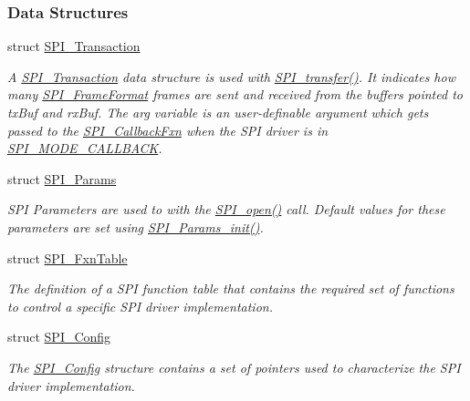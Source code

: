 \subsubsection*{Data Structures}
\begin{DoxyCompactItemize}
\item 
struct \hyperlink{struct_s_p_i___transaction}{S\-P\-I\-\_\-\-Transaction}
\begin{DoxyCompactList}\small\item\em A \hyperlink{struct_s_p_i___transaction}{S\-P\-I\-\_\-\-Transaction} data structure is used with \hyperlink{_s_p_i_8h_a989e17f96b54fcc3dc2cac5f8ac6bdb2}{S\-P\-I\-\_\-transfer()}. It indicates how many \hyperlink{_s_p_i_8h_a53949638d43ae7bf71b74c2b136ad206}{S\-P\-I\-\_\-\-Frame\-Format} frames are sent and received from the buffers pointed to tx\-Buf and rx\-Buf. The arg variable is an user-\/definable argument which gets passed to the \hyperlink{_s_p_i_8h_aeb03e7608a14021c3b0acf92c90e2168}{S\-P\-I\-\_\-\-Callback\-Fxn} when the S\-P\-I driver is in \hyperlink{_s_p_i_8h_ab9ea76c6529d6076eee5e1c4a5a92c6fa5631e69925c47a62a261c78ebbda39fb}{S\-P\-I\-\_\-\-M\-O\-D\-E\-\_\-\-C\-A\-L\-L\-B\-A\-C\-K}. \end{DoxyCompactList}\item 
struct \hyperlink{struct_s_p_i___params}{S\-P\-I\-\_\-\-Params}
\begin{DoxyCompactList}\small\item\em S\-P\-I Parameters are used to with the \hyperlink{_s_p_i_8h_a62cfe494cb1df47cd602e8747e894fd1}{S\-P\-I\-\_\-open()} call. Default values for these parameters are set using \hyperlink{_s_p_i_8h_a9c3dd1748332fd6e31c79a6538a71642}{S\-P\-I\-\_\-\-Params\-\_\-init()}. \end{DoxyCompactList}\item 
struct \hyperlink{struct_s_p_i___fxn_table}{S\-P\-I\-\_\-\-Fxn\-Table}
\begin{DoxyCompactList}\small\item\em The definition of a S\-P\-I function table that contains the required set of functions to control a specific S\-P\-I driver implementation. \end{DoxyCompactList}\item 
struct \hyperlink{struct_s_p_i___config}{S\-P\-I\-\_\-\-Config}
\begin{DoxyCompactList}\small\item\em The \hyperlink{struct_s_p_i___config}{S\-P\-I\-\_\-\-Config} structure contains a set of pointers used to characterize the S\-P\-I driver implementation. \end{DoxyCompactList}\end{DoxyCompactItemize}
